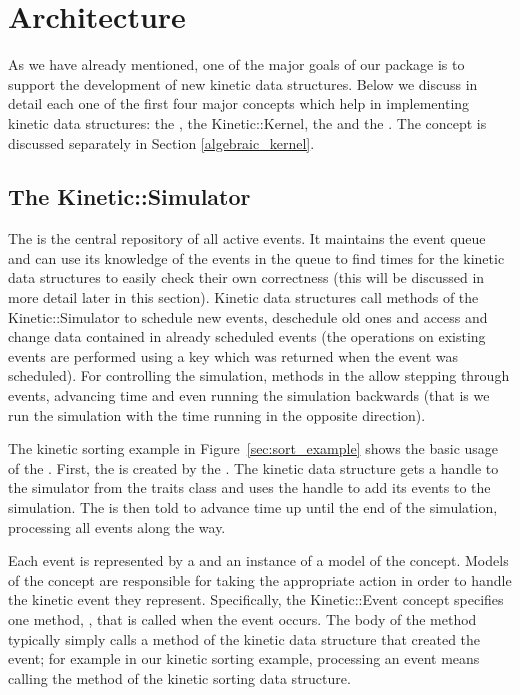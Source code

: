 
\section{Architecture}
\label{sec:architecture}

As we have already mentioned, one of the major goals of our package is
to support the development of new kinetic data structures. Below we
discuss in detail each one of the first four major concepts which help
in implementing kinetic data structures: the ,
the Kinetic::Kernel, the  and the
.  The 
concept is discussed separately in Section \ref{algebraic_kernel}.

\subsection{The Kinetic::Simulator}
\label{simulator}

The  is the central repository of all active events.
It maintains the event queue and can use its knowledge of the events
in the queue to find times for the kinetic data structures to easily
check their own correctness (this will be discussed in more detail
later in this section). Kinetic data structures call methods of the
Kinetic::Simulator to schedule new events, deschedule old ones and
access and change data contained in already scheduled events (the
operations on existing events are performed using a key which was
returned when the event was scheduled).  For controlling the
simulation, methods in the  allow stepping through
events, advancing time and even running the simulation backwards (that
is we run the simulation with the time running in the opposite
direction).

The kinetic sorting example in Figure~\ref{sec:sort_example} shows the
basic usage of the . First, the 
is created by the . The kinetic data structure
gets a handle to the simulator from the traits class and uses the
handle to add its events to the simulation. The  is
then told to advance time up until the end of the simulation,
processing all events along the way.

Each event is represented by a  and an instance of a
model of the  concept.  Models of the 
concept are responsible for taking the appropriate action in order to
handle the kinetic event they represent.  Specifically, the
Kinetic::Event concept specifies one method,
, that is called when the event occurs.
The body of the  method typically
simply calls a method of the kinetic data structure that created the
event; for example in our kinetic sorting example, processing an event
means calling the 
method of the kinetic sorting data structure.

